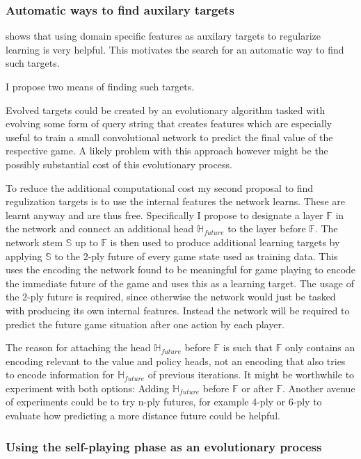 \documentclass[12pt,onecolumn,oneside,titlepage]{article}
\begin{document}
\subsubsection{Automatic ways to find auxilary targets}

\cite{wu2019accelerating} shows that using domain specific features as auxilary targets to regularize learning is very helpful. This motivates the search for an automatic way to find such targets.

I propose two means of finding such targets.

Evolved targets could be created by an evolutionary algorithm tasked with evolving some form of query string that creates features which are especially useful to train a small convolutional network to predict the final value of the respective game.
A likely problem with this approach however might be the possibly substantial cost of this evolutionary process.

To reduce the additional computational cost my second proposal to find regulization targets is to use the internal features the network learns. These are learnt anyway and are thus free.
Specifically I propose to designate a layer $\mathbb{F}$ in the network and connect an additional head $\mathbb{H}_{future}$ to the layer before $\mathbb{F}$. 
The network stem $\mathbb{S}$ up to $\mathbb{F}$ is then used to produce additional learning targets by applying $\mathbb{S}$ to the 2-ply future of every game state used as training data.
This uses the encoding the network found to be meaningful for game playing to encode the immediate future of the game and uses this as a learning target. The usage of the 2-ply future is required, since otherwise the network would just be tasked with producing
its own internal features. Instead the network will be required to predict the future game situation after one action by each player.

The reason for attaching the head $\mathbb{H}_{future}$ before $\mathbb{F}$ is such that $\mathbb{F}$ only contains an encoding relevant to the value and policy heads, not an encoding that also tries to encode information for $\mathbb{H}_{future}$ of previous iterations.
It might be worthwhile to experiment with both options: Adding $\mathbb{H}_{future}$ before $\mathbb{F}$ or after $\mathbb{F}$.
Another avenue of experiments could be to try n-ply futures, for example 4-ply or 6-ply to evaluate how predicting a more distance future could be helpful.

\subsubsection{Using the self-playing phase as an evolutionary process}
\end{document}
